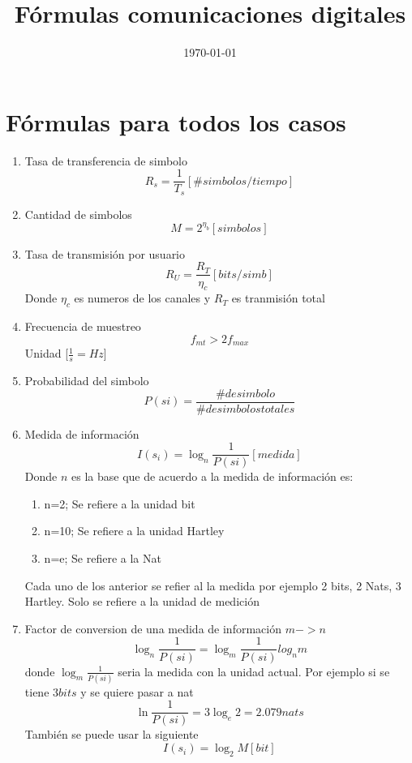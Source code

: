 \documentclass[10pt]{article}
\title{Fórmulas comunicaciones digitales}
\date{\today}
\begin{document}
	
	\maketitle
	
\section{Fórmulas para todos los casos}
\begin{enumerate}
 	\item Tasa de transferencia de simbolo
 	\begin{equation}
 		R_s=\frac{1}{T_s}[\#simbolos/tiempo]
 	\end{equation}
	\item Cantidad de simbolos
	\begin{equation}
		M=2^{\eta_b} [simbolos]
	\end{equation}
	\item  Tasa de transmisión por usuario
	\begin{equation}
		R_U=\frac{R_T}{\eta_c} [bits/simb]
	\end{equation}
	Donde $\eta_c$ es numeros de los canales y $R_T$  es tranmisión total
	\item Frecuencia de muestreo
	\begin{equation}
	f_{mt}>2f_{max}
	\end{equation}
	Unidad [$\frac{1}{s}=Hz$]
	\item  Probabilidad del simbolo
	\begin{equation}
		P(si)=\frac{\# de simbolo}{\# de simbolos totales}
	\end{equation}
	
	\item  Medida de información
		\begin{equation}
		I(s_i)=\log_{n}{\frac{1}{P(si)}} [medida]
	\end{equation}
		Donde $n$ es la base que de acuerdo a la medida de información es:
	
	\begin{enumerate}
		\item   n=2; Se refiere a la unidad bit
		\item   n=10; Se refiere a la unidad Hartley
		\item   n=e; Se refiere a la Nat
	\end{enumerate} 
	Cada uno de los anterior se refier al la medida por ejemplo 2 bits, 2 Nats, 3 Hartley. Solo se refiere a la unidad de medición
	\item Factor de conversion de una medida de información $m->n$
	\begin{equation}
		\log_{n}{\frac{1}{P(si)}}=\log_{m}{\frac{1}{P(si)}}log_{n}{m}
	\end{equation}
	donde $\log_{m}{\frac{1}{P(si)}}$ seria la medida con la unidad actual. Por ejemplo si se tiene $3bits$ y se quiere pasar a nat
	\begin{equation}
		\ln{\frac{1}{P(si)}}=3\log_e{2}=2.079 nats
	\end{equation}
		También se puede usar la siguiente
	\begin{equation}
	I(s_i)=\log_{2}{M} [bit]
\end{equation}


\end{enumerate}
\end{document}
